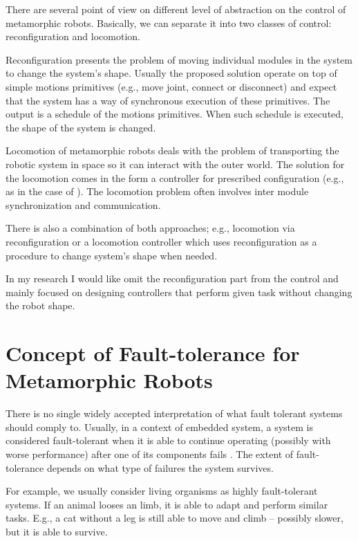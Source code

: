 There are several point of view on different level of abstraction on the control
of metamorphic robots. Basically, we can separate it into two classes of
control: reconfiguration and locomotion.

Reconfiguration presents the problem of moving individual modules in the system
to change the system's shape. Usually the proposed solution operate on top of
simple motions primitives (e.g., move joint, connect or disconnect) and expect
that the system has a way of synchronous execution of these primitives. The
output is a schedule of the motions primitives. When such schedule is
executed, the shape of the system is changed. 

Locomotion of metamorphic robots deals with the problem of transporting the
robotic system in space so it can interact with the outer world. The solution
for the locomotion comes in the form a controller for prescribed configuration
(e.g., as in the case of ). The locomotion problem often involves
inter module synchronization and communication.

There is also a combination of both approaches; e.g., locomotion via
reconfiguration or a locomotion controller which uses reconfiguration as a
procedure to change system's shape when needed.

In my research I would like omit the reconfiguration part from the control and
mainly focused on designing controllers that perform given task without changing
the robot shape.

\section{Concept of Fault-tolerance for Metamorphic Robots}


There is no single widely accepted interpretation of what fault tolerant systems
should comply to. Usually, in a context of embedded system, a system is
considered fault-tolerant when it is able to continue operating (possibly with
worse performance) after one of its components fails
\cite{DBLP:journals/micro/Johnson84}. The extent of fault-tolerance depends on
what type of failures the system survives.

For example, we usually consider living organisms as highly fault-tolerant
systems. If an animal looses an limb, it is able to adapt and perform similar
tasks. E.g., a cat without a leg is still able to move and climb -- possibly
slower, but it is able to survive.

